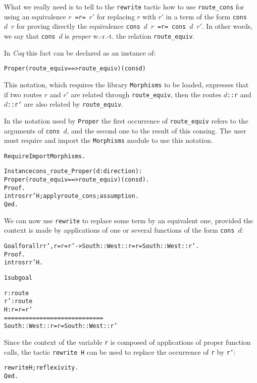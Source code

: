 \documentclass[a4]{report}
\newcommand{\coq}{\mbox{\emph{Coq}}}
\begin{document}
What we really need is to tell to the \texttt{rewrite} tactic how to
use \texttt{route\_cons} for using an equivalence \texttt{$r$ =r= $r'$}
for replacing $r$ with $r'$ in a term of the form \texttt{cons $d$ $r$}
for proving directly the equivalence \texttt{cons $d$ $r$ =r= cons $d$ $r'$}.
In other words, we say that \texttt{cons $d$} is \emph{proper} w.-r.-t.
the relation \texttt{route\_equiv}.

In {\coq} this fact can be declared as an instance of:
\begin{alltt}
   Proper (route\_equiv ==> route\_equiv) (cons d)
\end{alltt}

This notation, which requires the library \texttt{Morphisms} to be loaded,
expresses that if two routes $r$ and $r'$ are related through 
\texttt{route\_equiv}, then the routes \texttt{$d$::r} and \texttt{$d$::r'}
are also related by \texttt{route\_equiv}.

In the notation used by \texttt{Proper} the first occurrence of
\texttt{route\_equiv} refers to the arguments of \texttt{cons $d$}, and the second one 
to the result of this consing. The user must require and import 
the \texttt{Morphisms} module to use this notation.
\begin{alltt}
Require Import Morphisms.

Instance cons_route_Proper (d:direction) : 
    Proper (route_equiv ==> route_equiv) (cons d).
Proof.
  intros r r' H ;apply route_cons;assumption.
Qed.
\end{alltt}

We can now use \texttt{rewrite} to replace some 
term by an equivalent one, provided the context is made by applications of
one or several functions of the form \texttt{cons $d$}:

\begin{alltt}
Goal forall r r', r =r= r' -> South::West::r =r= South::West::r'.
Proof.
  intros r r' H. \it\color{red}

1 subgoal
  
  r : route
  r' : route
  H : r =r= r'
  ============================
   South :: West :: r =r= South :: West :: r'
\end{alltt}

Since the context of the  
variable \texttt{r} is composed of applications of proper function
 calls, the tactic \texttt{rewrite H} can be used to replace the occurrence of
\texttt{r} by \texttt{r'}:

\begin{alltt}
  rewrite H;reflexivity.
Qed.
\end{alltt}
\end{document}
